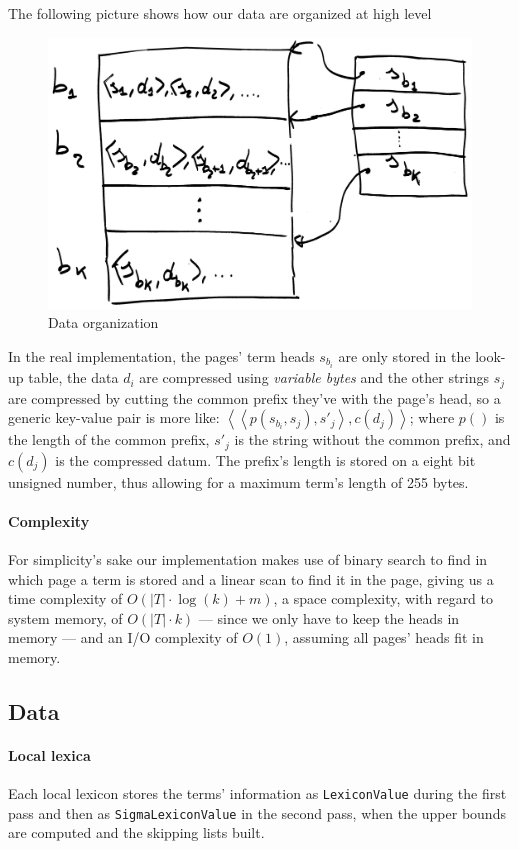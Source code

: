 \documentclass[parskip=full]{report}
\begin{document}
The following picture shows how our data are organized at high level

\begin{figure}[H]
	\centering
	\includegraphics[width=0.6\linewidth]{assets/disk_map_base}
	\caption[]{Data organization}
	\label{fig:diskmapbase}
\end{figure}

In the real implementation, the pages' term heads $s_{b_i}$ are only stored in the look-up table, the data $d_i$ are compressed using \textit{variable bytes} and the other strings $s_j$ are compressed by cutting the common prefix they've with the page's head, so a generic key-value pair is more like:
$\left<	\left< p(s_{b_i}, s_j), {s'}_j \right>, c(d_j)	\right>$; where $p()$ is the length of the common prefix, $ {s'}_j$ is the string without the common prefix, and $c(d_j)$ is the compressed datum. The prefix's length is stored on a eight bit unsigned number, thus allowing for a maximum term's length of 255 bytes.

\paragraph{Complexity}
For simplicity's sake our implementation makes use of binary search to find in which page a term is stored and a linear scan to find it in the page, giving us a time complexity of 
$O\left(	|T|\cdot\log(k) + m	\right)$,
a space complexity, with regard to system memory, of
$O\left(	|T|\cdot k	\right)$
--- since we only have to keep the heads in memory --- and an I/O complexity of
$O\left(	1	\right)$, assuming all pages' heads fit in memory.

\subsection{Data}

\paragraph{Local lexica}
Each local lexicon stores the terms' information as \texttt{LexiconValue} during the first pass and then as \texttt{SigmaLexiconValue} in the second pass, when the upper bounds are computed and the skipping lists built.
\end{document}
